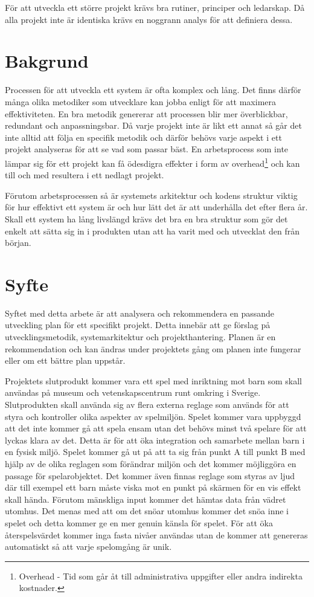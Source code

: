 \documentclass[a4paper,12pt,oneside,final]{extbook}
\begin{document}
För att utveckla ett större projekt krävs bra rutiner, principer och ledarskap. Då alla projekt inte är identiska krävs en noggrann analys för att definiera dessa.

\section{Bakgrund}
 Processen för att utveckla ett system är ofta komplex och lång. Det finns därför många olika metodiker som utvecklare kan jobba enligt för att maximera effektiviteten. En bra metodik genererar att processen blir mer överblickbar, redundant och anpassningsbar. Då varje projekt inte är likt ett annat så går det inte alltid att följa en specifik metodik och därför behövs varje aspekt i ett projekt analyseras för att se vad som passar bäst. En arbetsprocess som inte lämpar sig för ett projekt kan få ödesdigra effekter i form av overhead\footnote{Overhead - Tid som går åt till administrativa uppgifter eller andra indirekta kostnader.} och kan till och med resultera i ett nedlagt projekt.

Förutom arbetsprocessen så är systemets arkitektur och kodens struktur viktig för hur effektivt ett system är och hur lätt det är att underhålla det efter flera år. Skall ett system ha lång livslängd krävs det bra en bra struktur som gör det enkelt att sätta sig in i produkten utan att ha varit med och utvecklat den från början.
\section{Syfte}

Syftet med detta arbete är att analysera och rekommendera en passande utveckling plan för ett specifikt projekt. Detta innebär att ge förslag på utvecklingsmetodik, systemarkitektur och projekthantering. Planen är en rekommendation och kan ändras under projektets gång om planen inte fungerar eller om ett bättre plan uppstår. 

Projektets slutprodukt kommer vara ett spel med inriktning mot barn som skall användas på museum och vetenskapscentrum runt omkring i Sverige. Slutprodukten skall använda sig av flera externa reglage som används för att styra och kontroller olika aspekter av spelmiljön. Spelet kommer vara uppbyggd att det inte kommer gå att spela ensam utan det behövs minst två spelare för att lyckas klara av det. Detta är för att öka integration  och samarbete mellan barn i en fysisk miljö. Spelet kommer gå ut på att ta sig från punkt A till punkt B med hjälp av de olika reglagen som förändrar miljön och det kommer möjliggöra en passage för spelarobjektet. Det kommer även finnas reglage som styras av ljud där till exempel ett barn måste viska mot en punkt på skärmen för en vis effekt skall hända. Förutom mänskliga input kommer det hämtas data från vädret utomhus. Det menas med att om det snöar utomhus kommer det snöa inne i spelet och detta kommer ge en mer genuin känsla för spelet. För att öka återspelsvärdet kommer inga fasta nivåer användas utan de kommer att genereras automatiskt så att varje spelomgång är unik.
\end{document}
